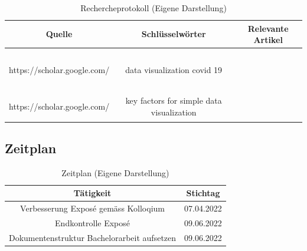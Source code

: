 \documentclass[12pt, oneside]{article}
\begin{document}
\begin{table}[h]
	\begin{center}
		\begin{tabular}{ |c|c|c| }
			\hline
			\textbf{Quelle}& \textbf{Schlüsselwörter}& \textbf{Relevante Artikel}\\
			\hline
			\multirow{3}{*}{https://scholar.google.com/}&\multirow{3}{3cm}{data visualization covid 19}& ~\citep{data_visualization_for_understanding_of_covid19}\\
			  &   & ~\citep{big_data_visualization_and_visual_analytics_of_covid_19_data} \\&& ~\citep{mapping_landscape_of_covid19_crisis_visualizations}\\
			\hline
			\multirow{2}{*}{https://scholar.google.com/} & \multirow{2}{4cm}{key factors for
			simple data visualization}&~\citep{datenvisualisierungen_grundlagen_und_praxis}\\&& ~\citep{datenvisualisierungen_modern_web}\\
			\hline
		\end{tabular}
		\caption{\label{tab:research-protocol}Rechercheprotokoll (Eigene Darstellung)}
	\end{center}
\end{table}

\subsection*{Zeitplan}

\begin{table}[h]
	\begin{center}
		\begin{tabular}{ |c|c| }
			\hline
			\textbf{Tätigkeit}& \textbf{Stichtag}\\
			\hline
			Verbesserung Exposé gemäss Kolloqium & 07.04.2022 \\
			\hline
			Endkontrolle Exposé & 09.06.2022 \\
			\hline
			Dokumentenstruktur Bachelorarbeit aufsetzen & 09.06.2022 \\
			\hline
		\end{tabular}
		\caption{\label{tab:time-table}Zeitplan (Eigene Darstellung)}
	\end{center}
\end{table}







\clearpage



\clearpage
\printglossaries
\end{document}
